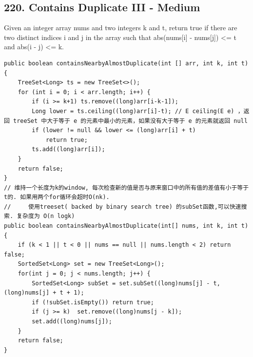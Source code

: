 \documentclass[9pt, b5paaper]{book}
\begin{document}
\subsection{220. Contains Duplicate III - Medium}
\label{sec-5-0-5}
Given an integer array nums and two integers k and t, return true if there are two distinct indices i and j in the array such that abs(nums[i] - nums[j]) <= t and abs(i - j) <= k.
\begin{verbatim}
public boolean containsNearbyAlmostDuplicate(int [] arr, int k, int t) {
    TreeSet<Long> ts = new TreeSet<>();
    for (int i = 0; i < arr.length; i++) {
        if (i >= k+1) ts.remove((long)arr[i-k-1]);
        Long lower = ts.ceiling((long)arr[i]-t); // E ceiling(E e) ，返回 treeSet 中大于等于 e 的元素中最小的元素，如果没有大于等于 e 的元素就返回 null
        if (lower != null && lower <= (long)arr[i] + t)
            return true;
        ts.add((long)arr[i]);
    }
    return false;
}
// 维持一个长度为k的window, 每次检查新的值是否与原来窗口中的所有值的差值有小于等于t的. 如果用两个for循环会超时O(nk).
//     使用treeset( backed by binary search tree) 的subSet函数,可以快速搜索. 复杂度为 O(n logk)
public boolean containsNearbyAlmostDuplicate(int[] nums, int k, int t) {
    if (k < 1 || t < 0 || nums == null || nums.length < 2) return false;
    SortedSet<Long> set = new TreeSet<Long>();
    for(int j = 0; j < nums.length; j++) {
        SortedSet<Long> subSet = set.subSet((long)nums[j] - t, (long)nums[j] + t + 1);
        if (!subSet.isEmpty()) return true;
        if (j >= k)  set.remove((long)nums[j - k]);
        set.add((long)nums[j]);
    }
    return false;
}
\end{verbatim}
\end{document}
